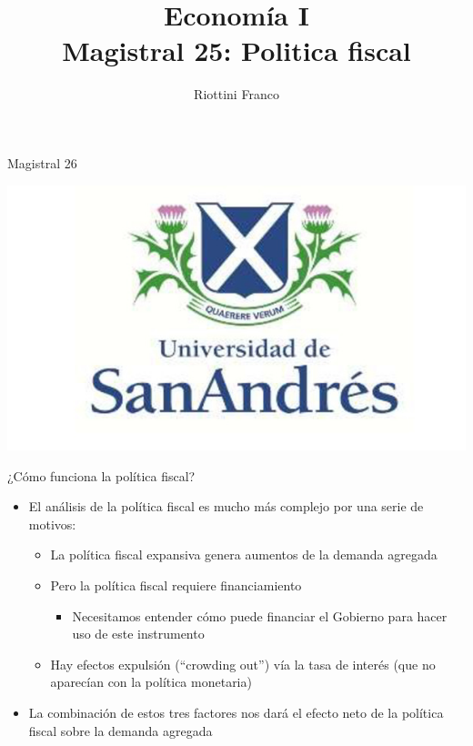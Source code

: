 \documentclass{beamer}
\title[Economía I]{Economía I \vspace{4mm}
\\ Magistral 25: Politica fiscal}
\date{}
\author[Riottini]{Riottini Franco}
\institute[]{Universidad de San Andrés}
\begin{document}
\begin{frame}
\titlepage
\centering
Magistral 26

\includegraphics[scale=0.2]{../Figures/logoUDESA.jpg} 
\end{frame}

\begin{frame}{¿Cómo funciona la política fiscal?}
    \begin{itemize}
        \item El análisis de la política fiscal es mucho más complejo por una serie de motivos:
        \begin{itemize}
            \item La política fiscal expansiva genera aumentos de la demanda agregada 
            \item Pero la política fiscal requiere financiamiento
            \begin{itemize}
                \item Necesitamos entender cómo puede financiar el Gobierno para hacer uso de este instrumento
            \end{itemize}
            \item Hay efectos expulsión (“crowding out”) vía la tasa de interés (que no aparecían con la política monetaria)
        \end{itemize}
        \item La combinación de estos tres factores nos dará el efecto neto de la política fiscal sobre la demanda agregada
    \end{itemize}
\end{frame}
\end{document}
